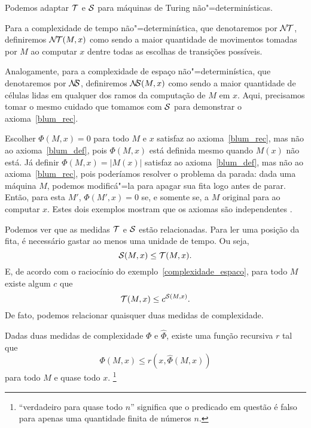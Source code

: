 \begin{example}
    \label{complexidade_nao_deterministica}
    Podemos adaptar ${\mathcal{T}}$ e ${\mathcal{S}}$
    para máquinas de Turing não"=determinísticas.

    Para a complexidade de tempo não"=determinística,
    que denotaremos por ${\mathcal{N\!T}}$,
    definiremos ${\mathcal{N\!T}}(M, x)$
    como sendo a maior quantidade de movimentos
    tomadas por $M$ ao computar $x$
    dentre todas as escolhas de transições possíveis.

    Analogamente,
    para a complexidade de espaço não"=determinística,
    que denotaremos por ${\mathcal{N\!\!S}}$,
    definiremos ${\mathcal{N\!\!S}}(M, x)$
    como sendo a maior quantidade de células lidas
    em qualquer dos ramos da computação de $M$ em $x$.
    Aqui, precisamos tomar o mesmo cuidado que tomamos
    com ${\mathcal{S}}$ para demonstrar o axioma~\ref{blum_rec}.
\end{example}

\begin{example}
    Escolher $\Phi(M, x) = 0$ para todo $M$ e $x$
    satisfaz ao axioma~\ref{blum_rec},
    mas não ao axioma~\ref{blum_def},
    pois $\Phi(M, x)$ está definida mesmo quando $M(x)$ não está.
    Já definir $\Phi(M, x) = |M(x)|$
    satisfaz ao axioma~\ref{blum_def},
    mas não ao axioma~\ref{blum_rec},
    pois poderíamos resolver o problema da parada:
    dada uma máquina $M$, podemos modificá"=la
    para apagar sua fita logo antes de parar.
    Então, para esta $M'$,
    $\Phi(M', x) = 0$ se, e somente se,
    a $M$ original para ao computar $x$.
    Estes dois exemplos mostram que os axiomas são independentes
    \cite[p.~3]{Blum1967}.
\end{example}

Podemos ver que as medidas ${\mathcal{T}}$ e ${\mathcal{S}}$ estão relacionadas.
Para ler uma posição da fita,
é necessário gastar ao menos uma unidade de tempo.
Ou seja,
\begin{equation*}
    {\mathcal{S}}(M, x) \leq {\mathcal{T}}(M, x).
\end{equation*}
E, de acordo com o raciocínio do exemplo~\ref{complexidade_espaco},
para todo $M$ existe algum $c$ que
\begin{equation*}
    {\mathcal{T}}(M, x) \leq c^{{\mathcal{S}}(M, x)}.
\end{equation*}
De fato, podemos relacionar quaisquer duas medidas de complexidade.

\begin{theorem}
    \label{relacao_medidas}
    Dadas duas medidas de complexidade $\Phi$ e $\hat \Phi$,
    existe uma função recursiva $r$ tal que
    \begin{equation*}
        \Phi(M, x) \leq r( x, \hat \Phi(M, x))
    \end{equation*}
    para todo $M$ e quase todo $x$.%
    \footnote{
        ``verdadeiro para quase todo $n$''
        significa que o predicado em questão
        é falso para apenas uma quantidade finita de números $n$.
    }
\end{theorem}

